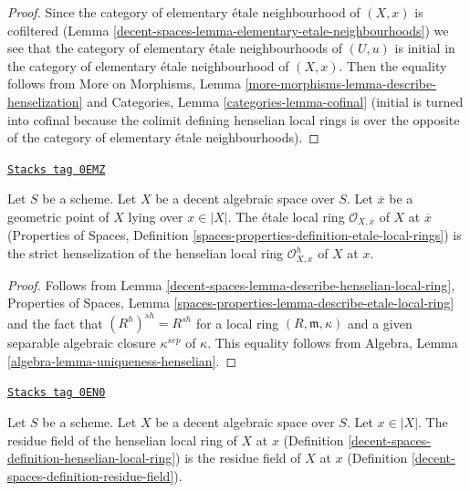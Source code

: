 \begin{proof}
Since the category of elementary \'etale neighbourhood of $(X, x)$
is cofiltered (Lemma \ref{decent-spaces-lemma-elementary-etale-neighbourhoods})
we see that
the category of elementary \'etale neighbourhoods of $(U, u)$
is initial in
the category of elementary \'etale neighbourhood of $(X, x)$.
Then the equality follows from
More on Morphisms, Lemma \ref{more-morphisms-lemma-describe-henselization}
and
Categories, Lemma \ref{categories-lemma-cofinal}
(initial is turned into cofinal because the colimit
defining henselian local rings is over the
opposite of the category of elementary
\'etale neighbourhoods).
\end{proof}

\begin{lemma}
\label{decent-spaces-lemma-henselian-local-ring-strict}
\href{https://stacks.math.columbia.edu/tag/0EMZ}{\texttt{Stacks tag 0EMZ}}

Let $S$ be a scheme. Let $X$ be a decent algebraic space over $S$.
Let $\overline{x}$ be a geometric point of $X$ lying over $x \in |X|$.
The \'etale local ring $\mathcal{O}_{X, \overline{x}}$ of $X$ at $\overline{x}$
(Properties of Spaces, Definition
\ref{spaces-properties-definition-etale-local-rings})
is the strict henselization
of the henselian local ring $\mathcal{O}_{X, x}^h$ of $X$ at $x$.
\end{lemma}

\begin{proof}
Follows from Lemma \ref{decent-spaces-lemma-describe-henselian-local-ring},
Properties of Spaces, Lemma
\ref{spaces-properties-lemma-describe-etale-local-ring}
and the fact that $(R^h)^{sh} = R^{sh}$
for a local ring $(R, \mathfrak m, \kappa)$ and a given
separable algebraic closure $\kappa^{sep}$ of $\kappa$.
This equality follows from
Algebra, Lemma \ref{algebra-lemma-uniqueness-henselian}.
\end{proof}

\begin{lemma}
\label{decent-spaces-lemma-residue-field-henselian-local-ring}
\href{https://stacks.math.columbia.edu/tag/0EN0}{\texttt{Stacks tag 0EN0}}

Let $S$ be a scheme. Let $X$ be a decent algebraic space over $S$.
Let $x \in |X|$. The residue field of the
henselian local ring of $X$ at $x$
(Definition \ref{decent-spaces-definition-henselian-local-ring})
is the residue field of $X$ at $x$
(Definition \ref{decent-spaces-definition-residue-field}).
\end{lemma}

